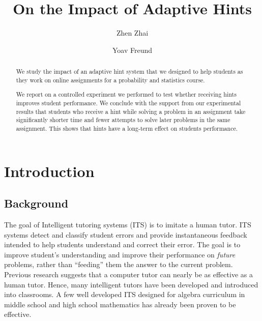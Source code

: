 \documentclass{llncs2e/llncs}
\title{On the Impact of Adaptive Hints}
\author{Zhen Zhai\inst{1} \and Yoav Freund\inst{2}}
\institute{UC San Diego \email{zzhai@eng.ucsd.edu} \and UC San Diego \email{yfreund@eng.ucsd.edu}}
\begin{document}
\maketitle

\begin{abstract}

We study the impact of an adaptive hint system that we designed to help students as they work on online assignments for a
probability and statistics course.

We report on a controlled experiment we performed to test whether receiving hints improves student performance. We conclude with the support from our experimental results that students who receive a hint while solving a problem in an assignment take significantly shorter time and fewer attempts to solve later problems in the same assignment. This shows that hints have a long-term effect on students performance.

\end{abstract}



\section{Introduction}



\subsection*{Background}
The goal of Intelligent tutoring systems (ITS)\cite{Anderson1995} is to imitate a human tutor.  ITS systems detect and classify student errors and provide instantaneous feedback intended to help students understand and correct their error. The goal is to improve student's understanding and improve their performance on {\em future} problems, rather than ``feeding'' them the answer to the current problem.  Previous research suggests that a computer tutor can nearly be as effective as a human tutor\cite{Vanlehn2011}. Hence, many intelligent tutors have been developed and introduced into classrooms. A few well developed ITS designed for algebra curriculum in middle school and high school mathematics has already been proven to be effective\cite{Koedinger1997,John2014}.
\end{document}
